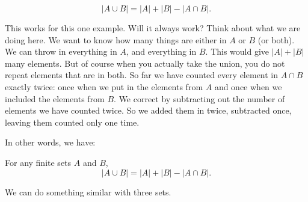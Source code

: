 \documentclass[10pt,]{book}
\theoremstyle{plain}
\theoremstyle{definition}
\theoremstyle{definition}
\theoremstyle{definition}
\theoremstyle{definition}
\numberwithin{equation}{chapter}
\newcommand{\card}[1]{\left| #1 \right|}
\begin{document}
\begin{equation*}
\card{A \cup B} = \card{A} + \card{B} - \card{A \cap B}.
\end{equation*}
%
\par
\hypertarget{p-727}{}%
This works for this one example. Will it always work? Think about what we are doing here. We want to know how many things are either in \(A\) or \(B\) (or both). We can throw in everything in \(A\), and everything in \(B\). This would give \(\card{A} + \card{B}\) many elements. But of course when you actually take the union, you do not repeat elements that are in both. So far we have counted every element in \(A \cap B\) exactly twice: once when we put in the elements from \(A\) and once when we included the elements from \(B\). We correct by subtracting out the number of elements we have counted twice. So we added them in twice, subtracted once, leaving them counted only one time.%
\par
\hypertarget{p-728}{}%
In other words, we have:%
\begin{assemblage}\label{assemblage-16}
\hypertarget{p-729}{}%
For any finite sets \(A\) and \(B\),%
\begin{equation*}
\card{A \cup B} = \card{A} + \card{B} - \card{A \cap B}.
\end{equation*}
%
\end{assemblage}
\hypertarget{p-730}{}%
We can do something similar with three sets.%
\end{document}
